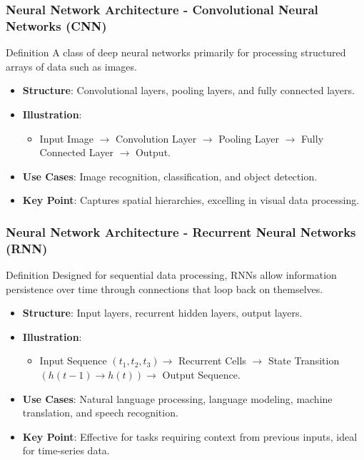 \documentclass[aspectratio=169]{beamer}
\begin{document}
\begin{frame}[fragile]
    \frametitle{Neural Network Architecture - Convolutional Neural Networks (CNN)}
    \begin{block}{Definition}
        A class of deep neural networks primarily for processing structured arrays of data such as images.
    \end{block}
    \begin{itemize}
        \item \textbf{Structure}: Convolutional layers, pooling layers, and fully connected layers.
        \item \textbf{Illustration}: 
            \begin{itemize}
                \item Input Image $\rightarrow$ Convolution Layer $\rightarrow$ Pooling Layer $\rightarrow$ Fully Connected Layer $\rightarrow$ Output.
            \end{itemize}
        \item \textbf{Use Cases}: Image recognition, classification, and object detection.
        \item \textbf{Key Point}: Captures spatial hierarchies, excelling in visual data processing.
    \end{itemize}
\end{frame}

\begin{frame}[fragile]
    \frametitle{Neural Network Architecture - Recurrent Neural Networks (RNN)}
    \begin{block}{Definition}
        Designed for sequential data processing, RNNs allow information persistence over time through connections that loop back on themselves.
    \end{block}
    \begin{itemize}
        \item \textbf{Structure}: Input layers, recurrent hidden layers, output layers.
        \item \textbf{Illustration}:
            \begin{itemize}
                \item Input Sequence $(t_1, t_2, t_3) \rightarrow$ Recurrent Cells $\rightarrow$ State Transition $(h(t-1) \rightarrow h(t)) \rightarrow$ Output Sequence.
            \end{itemize}
        \item \textbf{Use Cases}: Natural language processing, language modeling, machine translation, and speech recognition.
        \item \textbf{Key Point}: Effective for tasks requiring context from previous inputs, ideal for time-series data.
    \end{itemize}
\end{frame}
\end{document}
